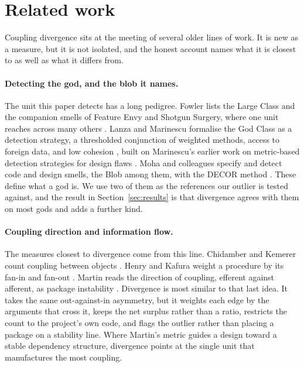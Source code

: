 \documentclass[11pt,a4paper]{article}
\begin{document}
\section{Related work}\label{sec:related}
Coupling divergence sits at the meeting of several older lines of work. It is new
as a measure, but it is not isolated, and the honest account names what it is
closest to as well as what it differs from.

\paragraph{Detecting the god, and the blob it names.}
The unit this paper detects has a long pedigree. Fowler lists the Large Class and
the companion smells of Feature Envy and Shotgun Surgery, where one unit reaches
across many others \cite{fowler}. Lanza and Marinescu formalise the God Class as a
detection strategy, a thresholded conjunction of weighted methods, access to
foreign data, and low cohesion \cite{lanza}, built on Marinescu's earlier work on
metric-based detection strategies for design flaws \cite{marinescu}. Moha and
colleagues specify and detect code and design smells, the Blob among them, with the
DECOR method \cite{decor}. These define what a god is. We use two of them as the
references our outlier is tested against, and the result in
Section~\ref{sec:results} is that divergence agrees with them on most gods and adds
a further kind.

\paragraph{Coupling direction and information flow.}
The measures closest to divergence come from this line. Chidamber and Kemerer count
coupling between objects \cite{chidamber}. Henry and Kafura weight a procedure by
its fan-in and fan-out \cite{henrykafura}. Martin reads the direction of coupling,
efferent against afferent, as package instability \cite{martin}. Divergence is most
similar to that last idea. It takes the same out-against-in asymmetry, but it
weights each edge by the arguments that cross it, keeps the net surplus rather than
a ratio, restricts the count to the project's own code, and flags the outlier
rather than placing a package on a stability line. Where Martin's metric guides a
design toward a stable dependency structure, divergence points at the single unit
that manufactures the most coupling.
\end{document}
